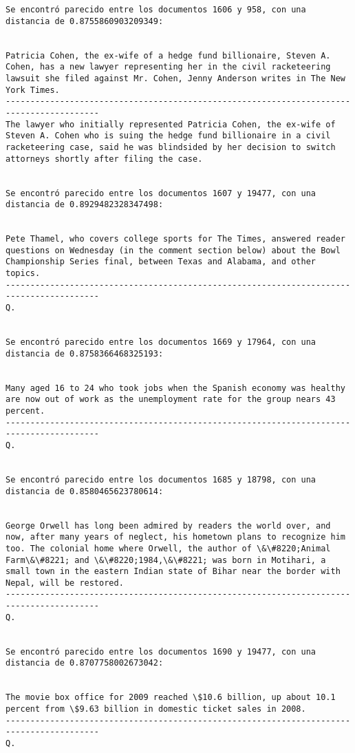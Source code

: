 \documentclass[11pt]{article}
\begin{document}
\begin{Verbatim}[commandchars=\\\{\}]
Se encontró parecido entre los documentos 1606 y 958, con una distancia de 0.8755860903209349:


Patricia Cohen, the ex-wife of a hedge fund billionaire, Steven A. Cohen, has a new lawyer representing her in the civil racketeering lawsuit she filed against Mr. Cohen, Jenny Anderson writes in The New York Times.
-----------------------------------------------------------------------------------------
The lawyer who initially represented Patricia Cohen, the ex-wife of Steven A. Cohen who is suing the hedge fund billionaire in a civil racketeering case, said he was blindsided by her decision to switch attorneys shortly after filing the case.


Se encontró parecido entre los documentos 1607 y 19477, con una distancia de 0.8929482328347498:


Pete Thamel, who covers college sports for The Times, answered reader questions on Wednesday (in the comment section below) about the Bowl Championship Series final, between Texas and Alabama, and other topics.
-----------------------------------------------------------------------------------------
Q.


Se encontró parecido entre los documentos 1669 y 17964, con una distancia de 0.8758366468325193:


Many aged 16 to 24 who took jobs when the Spanish economy was healthy are now out of work as the unemployment rate for the group nears 43 percent.
-----------------------------------------------------------------------------------------
Q.


Se encontró parecido entre los documentos 1685 y 18798, con una distancia de 0.8580465623780614:


George Orwell has long been admired by readers the world over, and now, after many years of neglect, his hometown plans to recognize him too. The colonial home where Orwell, the author of \&\#8220;Animal Farm\&\#8221; and \&\#8220;1984,\&\#8221; was born in Motihari, a small town in the eastern Indian state of Bihar near the border with Nepal, will be restored.
-----------------------------------------------------------------------------------------
Q.


Se encontró parecido entre los documentos 1690 y 19477, con una distancia de 0.8707758002673042:


The movie box office for 2009 reached \$10.6 billion, up about 10.1 percent from \$9.63 billion in domestic ticket sales in 2008.
-----------------------------------------------------------------------------------------
Q.



\end{Verbatim}
\end{document}
